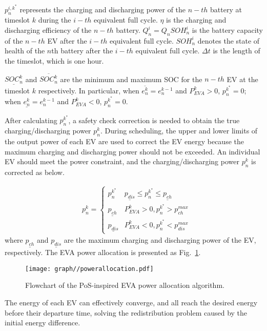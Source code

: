 \documentclass[journal,twoside]{IEEEtran}
\begin{document}
$p_{n}^{i,k^{*}}$ represents the charging and discharging power of the $n-{th}$ battery at timeslot $k$ during the $i-{th}$ equivalent full cycle. $\eta$ is the charging and discharging efficiency of the $n-{th}$ battery. $Q^i_n=Q_nSOH^i_n$ is the battery capacity of the $n-th$ EV after the $i-{th}$ equivalent full cycle. $SOH^i_n$ denotes the state of health of the $n$th battery after the $i-{th}$ equivalent full cycle. $\Delta t$ is the length of the timeslot, which is one hour.

$\underline{SOC_{n}^{k}}$ and $\overline{SOC_{n}^{k}}$ are the minimum and maximum SOC for the $n-th$ EV at the timeslot $k$ respectively. In particular, when $\overline{e_{n}^{k}}=e_{n}^{k-1}$ and $P_{EVA}^{k}>0$, $p_{n}^{k^{*}}=0$; when $\underline{e_{n}^{k}}=e_{n}^{k-1}$ and $P_{EVA}^{k}<0$, $p_{n}^{k^{*}}=0$.

After calculating $p_{n}^{k^{*}}$, a safety check correction is needed to obtain the true charging/discharging power $p_{n}^{k}$. During scheduling, the upper and lower limits of the output power of each EV are used to correct the EV energy because the maximum charging and discharging power should not be exceeded. An individual EV should meet the power constraint, and the charging/discharging power $p_{n}^{k}$ is corrected as below.

\begin{align}\label{soc1}
&p_{n}^{k}= \begin{cases}p_{n}^{k^{*}} & \underline{p_{dis}} \leqslant p_{n}^{k^{*}} \leqslant \underline{p_{ch}} \\
\underline{p_{ch}} & P_{EVA}^{k}>0, p_{n}^{k^{*}}>p_{ch}^{max} \\
\underline{p_{dis}} & P_{EVA}^{k}<0, p_{n}^{k^{*}}<p_{dis}^{max}\end{cases}
\end{align}
where $\underline{p_{ch}}$ and $\underline{p_{dis}}$ are the maximum charging and discharging power of the EV, respectively. The EVA power allocation is presented as Fig.~\ref{fig:flow}.

\begin{figure}[h]
\centering
\texttt{[image: graph//powerallocation.pdf]}
\caption{Flowchart of the PoS-inspired EVA power allocation algorithm.}
\label{fig:flow}
\end{figure}

The energy of each EV can effectively converge, and all reach the desired energy before their departure time, solving the redistribution problem caused by the initial energy difference.
\end{document}
